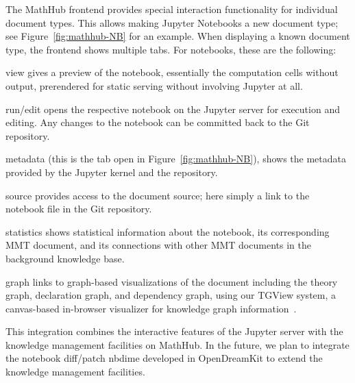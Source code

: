 The MathHub frontend provides special interaction functionality for individual document types.
This allows making Jupyter Notebooks a new document type; see Figure~\ref{fig:mathhub-NB} for an example.
When displaying a known document type, the frontend shows multiple tabs.
For notebooks, these are the following:
\begin{compactenum}[\em i\rm)]
\item \textsf{view} gives a preview of the notebook, essentially the computation cells without output, prerendered for static serving without involving Jupyter at all.%
\item \textsf{run/edit} opens the respective notebook on the Jupyter server for execution and editing.
Any changes to the notebook can be committed back to the Git repository. 
\item \textsf{metadata} (this is the tab open in Figure~\ref{fig:mathhub-NB}), shows the metadata provided by the Jupyter kernel and the repository. 
\item \textsf{source} provides access to the document source; here simply a link to the notebook file in the Git repository.
\item \textsf{statistics} shows statistical information about the notebook, its corresponding MMT document, and its connections with other MMT documents in the background knowledge base.
\item \textsf{graph} links to graph-based visualizations of the document including the theory graph, declaration graph, and dependency graph, using our TGView system, a canvas-based in-browser visualizer for knowledge graph information~\cite{RupKohMue:fitgv17}.
\end{compactenum}
This integration combines the interactive features of the Jupyter server with the knowledge management facilities on MathHub. In the future, we plan to integrate the notebook diff/patch \textsf{nbdime} developed in OpenDreamKit to extend the knowledge management facilities. 

